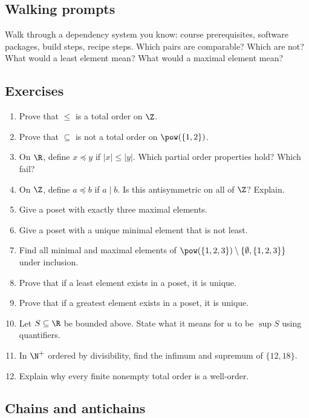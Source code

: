 \subsection{Walking prompts}

\begin{walkbox}
Walk through a dependency system you know: course prerequisites, software packages, build steps, recipe steps. Which pairs are comparable? Which are not? What would a least element mean? What would a maximal element mean?
\end{walkbox}

\subsection{Exercises}

\begin{enumerate}
\item Prove that $\leq$ is a total order on $\Z$.
\item Prove that $\subseteq$ is not a total order on $\pow(\{1,2\})$.
\item On $\R$, define $x\preceq y$ if $|x|\leq |y|$. Which partial order properties hold? Which fail?
\item On $\Z$, define $a\preceq b$ if $a\mid b$. Is this antisymmetric on all of $\Z$? Explain.
\item Give a poset with exactly three maximal elements.
\item Give a poset with a unique minimal element that is not least.
\item Find all minimal and maximal elements of $\pow(\{1,2,3\})\setminus\{\emptyset,\{1,2,3\}\}$ under inclusion.
\item Prove that if a least element exists in a poset, it is unique.
\item Prove that if a greatest element exists in a poset, it is unique.
\item Let $S\subseteq\R$ be bounded above. State what it means for $u$ to be $\sup S$ using quantifiers.
\item In $\N^+$ ordered by divisibility, find the infimum and supremum of $\{12,18\}$.
\item Explain why every finite nonempty total order is a well-order.
\end{enumerate}

\subsection{Chains and antichains}

